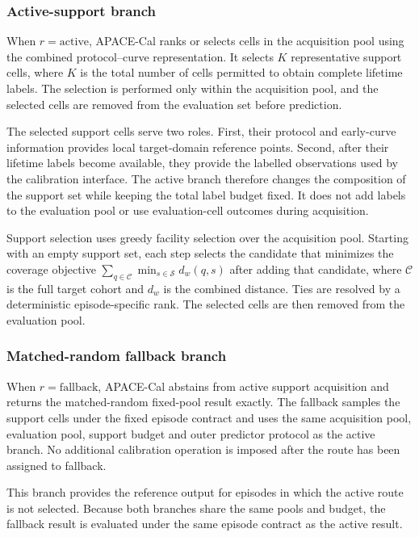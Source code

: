 \documentclass[preprint,12pt]{elsarticle}
\begin{document}
\subsubsection{Active-support branch}

When $r=\mathrm{active}$, APACE-Cal ranks or selects cells in the acquisition pool using the combined protocol--curve representation. It selects $K$ representative support cells, where $K$ is the total number of cells permitted to obtain complete lifetime labels. The selection is performed only within the acquisition pool, and the selected cells are removed from the evaluation set before prediction.

The selected support cells serve two roles. First, their protocol and early-curve information provides local target-domain reference points. Second, after their lifetime labels become available, they provide the labelled observations used by the calibration interface. The active branch therefore changes the composition of the support set while keeping the total label budget fixed. It does not add labels to the evaluation pool or use evaluation-cell outcomes during acquisition.

Support selection uses greedy facility selection over the acquisition pool. Starting with an empty support set, each step selects the candidate that minimizes the coverage objective $\sum_{q\in\mathcal{C}}\min_{s\in\mathcal{S}}d_w(q,s)$ after adding that candidate, where $\mathcal{C}$ is the full target cohort and $d_w$ is the combined distance. Ties are resolved by a deterministic episode-specific rank. The selected cells are then removed from the evaluation pool.

\subsubsection{Matched-random fallback branch}

When $r=\mathrm{fallback}$, APACE-Cal abstains from active support acquisition and returns the matched-random fixed-pool result exactly. The fallback samples the support cells under the fixed episode contract and uses the same acquisition pool, evaluation pool, support budget and outer predictor protocol as the active branch. No additional calibration operation is imposed after the route has been assigned to fallback.

This branch provides the reference output for episodes in which the active route is not selected. Because both branches share the same pools and budget, the fallback result is evaluated under the same episode contract as the active result.
\end{document}
